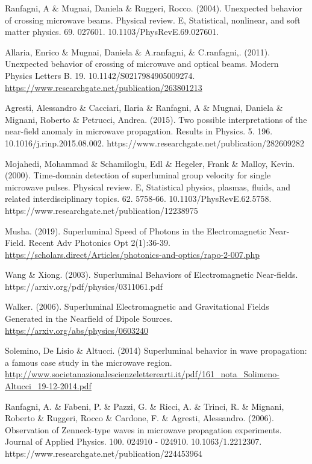\documentclass[twoside,final]{article}
\begin{document}
{\begin{thebibliography}{99}

 Ranfagni, A \& Mugnai, Daniela \& Ruggeri, Rocco. (2004).
Unexpected behavior of crossing microwave beams. Physical review. E,
Statistical, nonlinear, and soft matter physics. 69. 027601.
10.1103/PhysRevE.69.027601.

 Allaria, Enrico \& Mugnai, Daniela \& A.ranfagni, \& C.ranfagni,.
(2011). Unexpected behavior of crossing of microwave and optical beams. Modern
Physics Letters B. 19. 10.1142/S0217984905009274.
\href{https://www.researchgate.net/publication/263801213}{https://www.researchgate.net/publication/263801213}

 Agresti, Alessandro \& Cacciari, Ilaria \& Ranfagni, A \&
Mugnai, Daniela \& Mignani, Roberto \& Petrucci, Andrea. (2015). Two possible
interpretations of the near-field anomaly in microwave propagation. Results in
Physics. 5. 196. 10.1016/j.rinp.2015.08.002.
https://www.researchgate.net/publication/282609282 

 Mojahedi, Mohammad \& Schamiloglu, Edl \& Hegeler, Frank
\& Malloy, Kevin. (2000). Time-domain detection of superluminal group velocity
for single microwave pulses. Physical review. E, Statistical physics, plasmas,
fluids, and related interdisciplinary topics. 62. 5758-66.
10.1103/PhysRevE.62.5758. https://www.researchgate.net/publication/12238975 

 Musha. (2019). Superluminal Speed of Photons in the
Electromagnetic Near-Field. Recent Adv Photonics Opt 2(1):36-39.\\
\url{https://scholars.direct/Articles/photonics-and-optics/rapo-2-007.php}

 Wang \& Xiong. (2003). Superluminal Behaviors of
Electromagnetic Near-fields. https://arxiv.org/pdf/physics/0311061.pdf 

 Walker. (2006). Superluminal Electromagnetic and
Gravitational Fields Generated in the Nearfield of Dipole Sources.\\
\url{https://arxiv.org/abs/physics/0603240}

 Solemino, De Lisio \& Altucci. (2014) Superluminal
behavior in wave propagation: a famous case study in the microwave region.\\
\url{
http://www.societanazionalescienzeletterearti.it/pdf/161\_nota\_Solimeno-Altucci\_19-12-2014.pdf
}    


 Ranfagni, A. \& Fabeni, P. \& Pazzi, G. \& Ricci, A. \&
Trinci, R. \& Mignani, Roberto \& Ruggeri, Rocco \& Cardone, F. \& Agresti,
Alessandro. (2006). Observation of Zenneck-type waves in microwave propagation
experiments. Journal of Applied Physics. 100. 024910 - 024910.
10.1063/1.2212307. https://www.researchgate.net/publication/224453964 


\end{thebibliography}}
\end{document}
